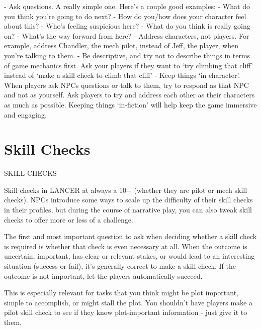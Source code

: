             -   Ask questions. A really simple one. Here’s a couple good examples:  
                     -   What do you think you’re going to do next?  
                     -   How do you/how does your character feel about this?  
                     -   Who’s feeling suspicious here?  
                     -   What do you think is really going on?  
                     -   What’s the way forward from here?   
            -   Address characters, not players. For example, address Chandler, the mech  
                 pilot, instead of Jeff, the player, when you’re talking to them.   
            -    Be descriptive, and try not to describe things in terms of game mechanics first.  
                Ask your players if they want to ‘try climbing that cliff’ instead of ‘make a skill  
                check to climb that cliff’  
            -    Keep things ‘in character’. When players ask NPCs questions or talk to them, try  
                to respond as that NPC and not as yourself. Ask players to try and address each  
                other as their characters as much as possible. Keeping things ‘in-fiction’ will help  
                 keep the game immersive and engaging.  

                                                                                                          
\chapter{Skill Checks}

                                           SKILL CHECKS  

Skill checks in LANCER at always a 10+ (whether they are pilot or mech skill checks). NPCs  
introduce some ways to scale up the difficulty of their skill checks in their profiles, but during the  
course of narrative play, you can also tweak skill checks to offer more or less of a challenge.
 

The first and most important question to ask when deciding whether a skill check is  
required is whether that check is even necessary at all. When the outcome is uncertain,  
important, has clear or relevant stakes, or would lead to an interesting situation (success or fail),  
it’s generally correct to make a skill check. If the outcome is not important, let the players  
automatically succeed.
 

This is especially relevant for tasks that you think might be plot important, simple to accomplish,  
or might stall the plot. You shouldn’t have players make a pilot skill check to see if they know  
plot-important information - just give it to them. 
 


